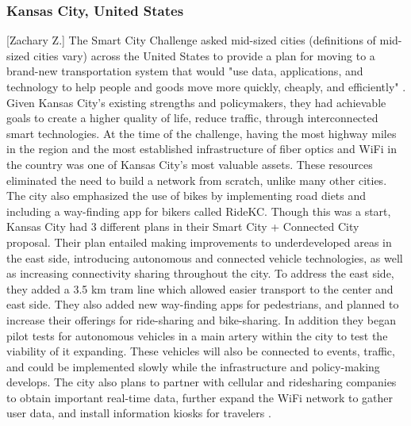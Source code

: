 \documentclass[12pt]{article}                               %
\begin{document}
\subsubsection{Kansas City, United States}[Zachary Z.]
The Smart City Challenge asked mid-sized cities (definitions of mid-sized cities vary) across the United States to provide a plan for moving to a brand-new transportation system that would "use data, applications, and technology to help people and goods move more quickly, cheaply, and efficiently" \cite{2016BeyondChallengeb}. Given Kansas City's existing strengths and policymakers, they had achievable goals to create a higher quality of life, reduce traffic, through interconnected smart technologies. At the time of the challenge, having the most highway miles in the region and the most established infrastructure of fiber optics and WiFi in the country was one of Kansas City's most valuable assets. These resources eliminated the need to build a network from scratch, unlike many other cities. The city also emphasized the use of bikes by implementing road diets and including a way-finding app for bikers called RideKC. Though this was a start, Kansas City had 3 different plans in their Smart City + Connected City proposal. Their plan entailed making improvements to underdeveloped areas in the east side, introducing autonomous and connected vehicle technologies, as well as increasing connectivity sharing throughout the city. To address the east side, they added a 3.5 km tram line which allowed easier transport to the center and east side. They also added new way-finding apps for pedestrians, and planned to increase their offerings for ride-sharing and bike-sharing. In addition they began pilot tests for autonomous vehicles in a main artery within the city to test the viability of it expanding. These vehicles will also be connected to events, traffic, and could be implemented slowly while the infrastructure and policy-making develops. The city also plans to partner with cellular and ridesharing companies to obtain important real-time data, further expand the WiFi network to gather user data, and install information kiosks for travelers \cite{2016BeyondChallengeb}.
\end{document}
